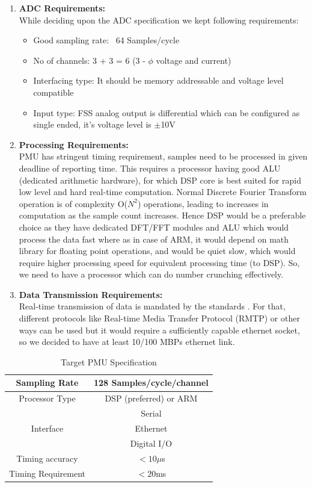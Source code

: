 \begin{enumerate}
	\item \textbf{ADC Requirements:}\\
	While deciding upon the ADC specification we kept following requirements: 
	\begin{itemize}
		\item Good sampling rate: ~64 Samples/cycle
		\item No of channels: 3 + 3 = 6 (3 - $\phi$ voltage and current) 
		\item Interfacing type: It should be memory addressable and voltage level compatible
		\item Input type: FSS analog output is differential which can be configured as single ended, it's voltage level is $\pm$10V
	\end{itemize}
	
	\item \textbf{Processing Requirements:}\\
	PMU has stringent timing requirement, samples need to be processed in given deadline of reporting time. This requires a processor having good ALU (dedicated arithmetic hardware), for which DSP core is best suited for rapid low level and hard real-time computation. Normal Discrete Fourier Transform operation is of complexity O($N^{2}$) operations, leading to increases in computation as the sample count increases. Hence DSP would be a preferable choice as they have dedicated DFT/FFT modules and ALU which would process the data fast  where as in case of ARM, it would depend on math library for floating point operations, and would be quiet slow, which would require higher processing speed for equivalent processing time (to DSP). So, we need to have a processor which can do number crunching effectively.   
	
	\item \textbf{Data Transmission Requirements:}\\
	Real-time transmission of data is mandated by the standards \cite{c37.118}. For that, different protocols like Real-time  Media Transfer Protocol (RMTP) or other ways can be used but it would require a sufficiently capable ethernet socket, so we decided to have at least 10/100 MBPs ethernet link.
\end{enumerate}

\begin{table}[h]
	\caption{Target PMU Specification}
	\centering
	\begin{tabular}{|c|c|}
		\hline
		Sampling Rate & 128 Samples/cycle/channel \\ 
		\hline
		Processor Type & DSP (preferred) or ARM \\
		\hline
		\multirow{3}{*}{Interface}& Serial \\
								& Ethernet \\
								& Digital I/O \\
								\hline
		Timing accuracy & $< 10 \mu$s \\
		\hline
		Timing Requirement & $< 20$ms \\
		\hline
	\end{tabular}
\label{tab:specs}
\end{table}



